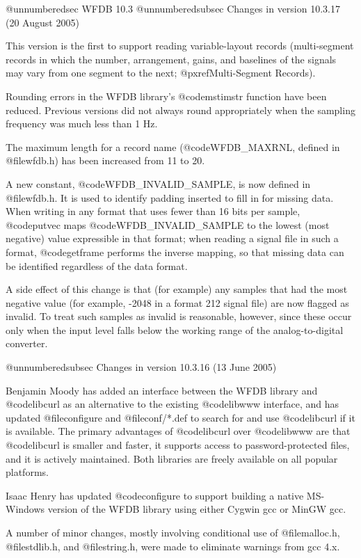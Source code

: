 {{{{{{{{@unnumberedsec WFDB 10.3
@unnumberedsubsec Changes in version 10.3.17 (20 August 2005)

This version is the first to support reading variable-layout records
(multi-segment records in which the number, arrangement, gains, and baselines
of the signals may vary from one segment to the next; @pxref{Multi-Segment
Records}).

Rounding errors in the WFDB library's @code{mstimstr} function have been
reduced.  Previous versions did not always round appropriately when the
sampling frequency was much less than 1 Hz.

The maximum length for a record name (@code{WFDB_MAXRNL}, defined in
@file{wfdb.h}) has been increased from 11 to 20.

A new constant, @code{WFDB_INVALID_SAMPLE}, is now defined in @file{wfdb.h}.
It is used to identify padding inserted to fill in for missing data.  When
writing in any format that uses fewer than 16 bits per sample, @code{putvec}
maps @code{WFDB_INVALID_SAMPLE} to the lowest (most negative) value expressible
in that format; when reading a signal file in such a format, @code{getframe}
performs the inverse mapping, so that missing data can be identified regardless
of the data format.

A side effect of this change is that (for example) any samples that had the
most negative value (for example, -2048 in a format 212 signal file) are now
flagged as invalid.  To treat such samples as invalid is reasonable, however,
since these occur only when the input level falls below the working range of
the analog-to-digital converter.

@unnumberedsubsec Changes in version 10.3.16 (13 June 2005)

Benjamin Moody has added an interface between the WFDB library and
@code{libcurl} as an alternative to the existing @code{libwww} interface, and
has updated @file{configure} and @file{conf/*.def} to search for and use
@code{libcurl} if it is available.  The primary advantages of @code{libcurl}
over @code{libwww} are that @code{libcurl} is smaller and faster, it supports
access to password-protected files, and it is actively maintained.  Both
libraries are freely available on all popular platforms.

Isaac Henry has updated @code{configure} to support building a native
MS-Windows version of the WFDB library using either Cygwin gcc or MinGW
gcc.

A number of minor changes, mostly involving conditional use of
@file{malloc.h}, @file{stdlib.h}, and @file{string.h}, were made to
eliminate warnings from gcc 4.x.

}}}}}}}}
